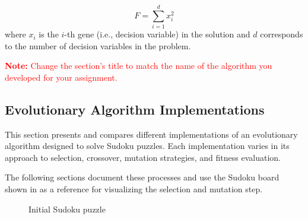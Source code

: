 \begin{equation}
    F = \sum_{i=1}^d x_i^2 
\end{equation}
where $x_i$ is the $i$-th gene (i.e., decision variable) in the solution and $d$ corresponds to the number of decision variables in the problem.

\textcolor{red}{\textbf{Note:} Change the section's title to match the name of the algorithm you developed for your assignment.}

\subsection{Evolutionary Algorithm Implementations}
This section presents and compares different implementations of an evolutionary algorithm designed to solve Sudoku puzzles. Each implementation varies in its approach to selection, crossover, mutation strategies, and fitness evaluation.

The following sections document these processes and use the Sudoku board shown in  as a reference for visualizing the selection and mutation step.

\begin{figure}[h]
\centering
{}
\caption{Initial Sudoku puzzle}
\label{fig:initial-sudoku}
\end{figure}

